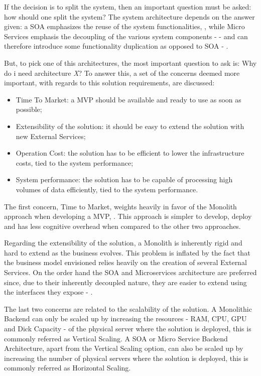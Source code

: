 If the decision is to split the system, then an important question must be asked: how should one split the system? The system architecture depends on the answer given: a \gls{SOA} emphasizes the reuse of the system functionalities, \cite{ibmsoa}, while Micro Services emphasis the decoupling of the various system components - \cite{micromicro} - and can therefore introduce some functionality duplication as opposed to \gls{SOA} - \cite{soavsmicro}.

But, to pick one of this architectures, the most important question to ask is: Why do i need architecture \textit{X}? To answer this, a set of the concerns deemed more important, with regards to this solution requirements, are discussed:

\begin{itemize}
   \item Time To Market: a \gls{MVP} should be available and ready to use as soon as possible;
   \item Extensibility of the solution: it should be easy to extend the solution with new External Services;
   \item Operation Cost: the solution has to be efficient to lower the infrastructure costs, tied to the system performance;
   \item System performance: the solution has to be capable of processing high volumes of data efficiently, tied to the system performance.
\end{itemize}

The first concern, Time to Market, weights heavily in favor of the Monolith approach when developing a \gls{MVP}, \cite{atlassianmono}. This approach is simpler to develop, deploy and has less cognitive overhead when compared to the other two approaches.

Regarding the extensibility of the solution, a Monolith is inherently rigid and hard to extend as the business evolves. This problem is inflated by the fact that the business model envisioned relies heavily on the creation of several External Services. On the order hand the \gls{SOA} and Microservices architecture are preferred since, due to their inherently decoupled nature, they are easier to extend using the interfaces they expose - \cite{microsoftmicro}.

The last two concerns are related to the scalability of the solution. A Monolithic Backend can only be scaled up by increasing the resources - RAM, CPU, GPU and Dick Capacity - of the physical server where the solution is deployed, this is commonly referred as Vertical Scaling. A \gls{SOA} or Micro Service Backend Architecture, apart from the Vertical Scaling option, can also be scaled up by increasing the number of physical servers where the solution is deployed, this is commonly referred as Horizontal Scaling.

